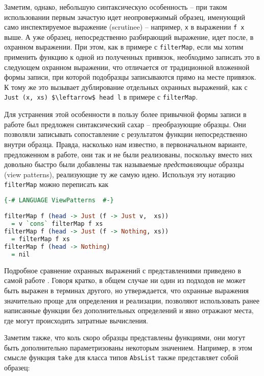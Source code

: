 Заметим, однако, небольшую синтаксическую особенность -- при таком использовании первым зачастую идет неопровержимый образец, именующий само инспектируемое выражение (scrutinee) -- например, \lstinline|x| в выражении \lstinline|f x| выше. А уже образец, непосредственно разбирающий выражение, идет после, в охранном выражении. При этом, как в примере с \lstinline|filterMap|, если мы хотим применить функцию к одной из полученных привязок, необходимо записать это в следующем охранном выражении, что отличается от традиционной вложенной формы записи, при которой подобразцы записываются прямо на месте привязок. К тому же это вызывает дублирование отдельных охранных выражений, как с \lstinline[breaklines]|Just (x, xs) $\leftarrow$ head l| в примере с \lstinline|filterMap|.

Для устранения этой особенности в пользу более привычной формы записи в работе был предложен синтаксический сахар -- преобразующие образцы. Они позволяли записывать сопоставление с результатом функции непосредственно внутри образца. Правда, насколько нам известно, в первоначальном варианте, предложенном в работе, они так и не были реализованы, поскольку вместо них довольно быстро были добавлены так называемые \textit{представляющие} образцы (view patterns), реализующие ту же самую идею. Используя эту нотацию \lstinline|filterMap| можно переписать как 

\noindent
\raggedbottom
\begin{minipage}{\linewidth}
\begin{lstlisting}[language=haskell]
{-# LANGUAGE ViewPatterns  #-}

filterMap f (head -> Just (f -> Just v,  xs))
  = v `cons` filterMap f xs
filterMap f (head -> Just (f -> Nothing, xs)) 
  = filterMap f xs
filterMap f (head -> Nothing)
  = nil
\end{lstlisting}
\end{minipage}

Подробное сравнение охранных выражений с представлениями приведено в самой работе \cite{erwig2000pattern}. Говоря кратко, в общем случае ни один из подходов не может быть выражен в терминах другого, но утверждается, что охранные выражения значительно проще для определения и реализации, позволяют использовать ранее написанные функции без дополнительных определений и явно отражают места, где могут происходить затратные вычисления.

Заметим также, что коль скоро образцы представлены функциями, они могут быть дополнительно параметризованы некоторым значением. Например, в этом смысле функция \lstinline|take| для класса типов \lstinline|AbsList| также представляет собой образец:

